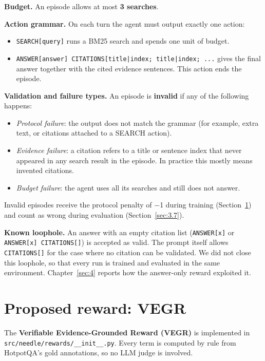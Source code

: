 \textbf{Budget.} An episode allows at most \textbf{3 searches}.

\textbf{Action grammar.} On each turn the agent must output exactly one
action:

\begin{itemize}
\tightlist
\item
  \texttt{SEARCH{[}query{]}} runs a BM25 search and spends one unit of
  budget.
\item
  \texttt{ANSWER{[}answer{]} CITATIONS{[}title|index; title|index; .\allowbreak{}.\allowbreak{}.\allowbreak{}{]}}
  gives the final answer together with the cited evidence sentences.
  This action ends the episode.
\end{itemize}

\textbf{Validation and failure types.} An episode is \textbf{invalid} if
any of the following happens:

\begin{itemize}
\tightlist
\item
  \emph{Protocol failure}: the output does not match the grammar (for
  example, extra text, or citations attached to a SEARCH action).
\item
  \emph{Evidence failure}: a citation refers to a title or sentence
  index that never appeared in any search result in the episode. In
  practice this mostly means invented citations.
\item
  \emph{Budget failure}: the agent uses all its searches and still does
  not answer.
\end{itemize}

Invalid episodes receive the protocol penalty of −1 during training
(Section~\ref{sec:3.4}) and count as wrong during evaluation
(Section~\ref{sec:3.7}).

\textbf{Known loophole.} An answer with an empty citation list
(\texttt{ANSWER{[}x{]}} or \texttt{ANSWER{[}x{]} CITATIONS{[}{]}}) is
accepted as valid. The prompt itself allows \texttt{CITATIONS{[}{]}} for
the case where no citation can be validated. We did not close this
loophole, so that every run is trained and evaluated in the same
environment. Chapter~\ref{sec:4} reports how the answer-only reward
exploited it.

\section{Proposed reward: VEGR}\label{sec:3.4}

The \textbf{Verifiable Evidence-Grounded Reward (VEGR)} is implemented
in
\texttt{src/\allowbreak{}needle/\allowbreak{}rewards/\allowbreak{}\_\allowbreak{}\_\allowbreak{}init\_\allowbreak{}\_\allowbreak{}.\allowbreak{}py}.
Every term is computed by rule from HotpotQA's gold annotations, so no
LLM judge is involved.

